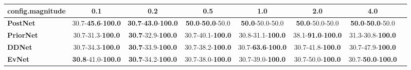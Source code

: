 \begin{tabular}{lccccccc}
\toprule
\textbf{config.magnitude} &                                0.1 &                                         0.2 &                               0.5 &                                1.0 &                                2.0 &                                4.0 \\
\midrule
\textbf{PostNet } &  30.7-\textbf{45.6}-\textbf{100.0} &  \textbf{30.7}-\textbf{43.0}-\textbf{100.0} &  \textbf{50.0}-\textbf{50.0}-50.0 &            \textbf{50.0}-50.0-50.0 &            \textbf{50.0}-50.0-50.0 &   \textbf{50.0}-\textbf{50.0}-50.0 \\
\textbf{PriorNet} &           30.7-31.3-\textbf{100.0} &           \textbf{30.7}-32.9-\textbf{100.0} &          30.7-40.1-\textbf{100.0} &           30.8-31.1-\textbf{100.0} &  38.1-\textbf{91.0}-\textbf{100.0} &           31.3-30.8-\textbf{100.0} \\
\textbf{DDNet   } &           30.7-34.3-\textbf{100.0} &           \textbf{30.7}-33.9-\textbf{100.0} &          30.7-38.2-\textbf{100.0} &  30.7-\textbf{63.6}-\textbf{100.0} &           30.7-41.8-\textbf{100.0} &           30.7-47.9-\textbf{100.0} \\
\textbf{EvNet   } &  \textbf{30.8}-41.0-\textbf{100.0} &           \textbf{30.7}-34.2-\textbf{100.0} &          30.7-38.0-\textbf{100.0} &           30.7-39.0-\textbf{100.0} &           30.7-50.0-\textbf{100.0} &  30.7-\textbf{50.0}-\textbf{100.0} \\
\bottomrule
\end{tabular}
